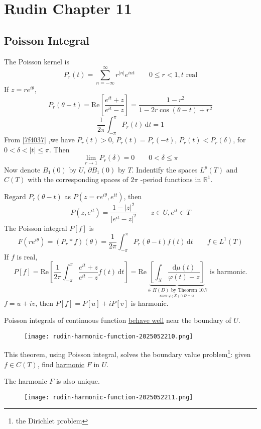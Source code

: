 \section{Rudin Chapter 11}

\subsection{Poisson Integral}

The Poisson kernel is
\[
P_{r}(t)=\sum_{n=-\infty}^{\infty} r^{\lvert n \rvert }e^{ int }\qquad 0\leq r<1, t\text{ real}
\]
If $z=re^{ i\theta }$,
\begin{equation}
P_{r}(\theta-t)=\mathrm{Re}\left[ \frac{e^{ it }+z}{e^{ it }-z} \right]=\frac{1-r^2}{1-2r\cos(\theta-t)+r^2}
\label{7f4037}
\end{equation}
\[
\frac{1}{2\pi}\int_{-\pi}^{\pi} P_{r}(t) \, \mathrm{d}t=1
\]
From \cref{7f4037} ,we have $P_{r}(t)>0$, $P_{r}(t)=P_{r}(-t)$, $P_{r}(t)<P_{r}(\delta)$, for $0<\delta<\lvert t \rvert\leq\pi$. Then
\[
\lim_{ r \to 1 } P_{r}(\delta)=0\qquad 0<\delta\leq \pi
\]
Now denote $B_1(0)$ by $U$, $\partial B_1(0)$ by $T$. Indentify the spaces $L^{p}(T)$ and $C(T)$ with the corresponding spaces of $2\pi$ -period functions in $\mathbb{R}^{1}$.

Regard $P_{r}(\theta-t)$ as $P(z=re^{ i\theta },e^{ it })$, then
\[
P(z,e^{ it })=\frac{1-\lvert z \rvert ^2}{\lvert e^{ it }-z \rvert ^2}\qquad z\in U,e^{ it }\in T
\]
The Poisson integral $P[f]$ is
\[
F(re^{ i\theta })=(P_{r}*f)(\theta)=\frac{1}{2\pi}\int_{-\pi}^{\pi} P_{r}(\theta-t)f(t) \, \mathrm{d}t\qquad f\in L^{1}(T)
\]
If $f$ is real,
\[
P[f]=\mathrm{Re}\left[ \frac{1}{2\pi}\int_{-\pi}^{\pi} \frac{e^{ it }+z}{e^{ it }-z}f(t) \, \mathrm{d}t  \right]=\mathrm{Re}\underbrace{ \left[ \int_{X}^{} \frac{\mathrm{d}\mu(t)}{\varphi(t)-z}  \right] }_{ \underset{ \text{since }\varphi(X)\cap D=\varnothing }{ \in H(D)\text{ by Theorem 10.7} } }\text{ is harmonic.}
\]
$f=u+iv$, then $P[f]=P[u]+iP[v]$ is harmonic.

Poisson integrals of continuous function \underline{behave well} near the boundary of $U$.
\begin{figure}[H]
\centering
\texttt{[image: rudin-harmonic-function-2025052210.png]}
\label{}
\end{figure}

\begin{note}
This theorem, using Poisson integral, solves the boundary value problem\footnote{the Dirichlet problem}: given $f\in C(T)$, find \underline{harmonic} $F$ in $U$.
\end{note}
The harmonic $F$ is also unique.
\begin{figure}[H]
\centering
\texttt{[image: rudin-harmonic-function-2025052211.png]}
\label{}
\end{figure}

